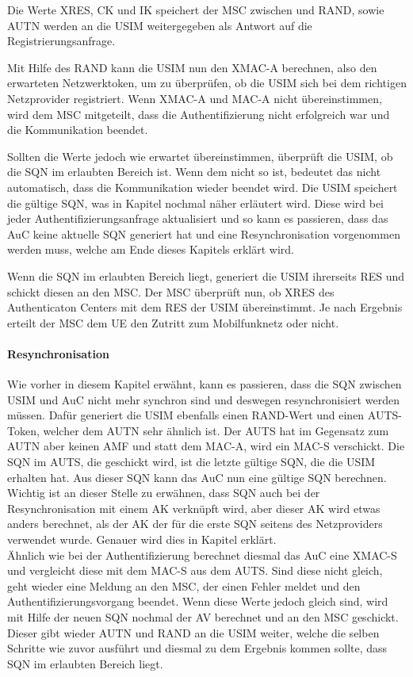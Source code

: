  Die Werte XRES, CK und IK speichert der MSC zwischen und RAND, sowie AUTN werden an die USIM
 weitergegeben als Antwort auf die Registrierungsanfrage.

 Mit Hilfe des RAND kann die USIM nun den XMAC-A berechnen, also den erwarteten Netzwerktoken, um
 zu überprüfen, ob die USIM sich bei dem richtigen Netzprovider registriert. Wenn XMAC-A
 und MAC-A nicht übereinstimmen, wird dem MSC mitgeteilt, dass die Authentifizierung nicht erfolgreich
 war und die Kommunikation beendet.

 Sollten die Werte jedoch wie erwartet übereinstimmen, überprüft die USIM, ob die SQN im erlaubten
 Bereich ist. Wenn dem nicht so ist, bedeutet das nicht automatisch, dass die Kommunikation wieder
 beendet wird. Die USIM speichert die gültige SQN, was in Kapitel 
 nochmal näher erläutert wird. Diese wird bei jeder Authentifizierungsanfrage aktualisiert und so kann
 es passieren, dass das AuC keine aktuelle SQN generiert hat und eine Resynchronisation vorgenommen
 werden muss, welche am Ende dieses Kapitels erklärt wird.
 
 Wenn die SQN im erlaubten Bereich liegt, generiert die USIM ihrerseits RES und schickt diesen an
 den MSC. Der MSC überprüft nun, ob XRES des Authenticaton Centers mit dem RES der USIM
 übereinstimmt. Je nach Ergebnis erteilt der MSC dem \ac{UE} den Zutritt zum Mobilfunknetz oder
 nicht.
 
 \paragraph{Resynchronisation}
 \label{par:resynchronisation}
  Wie vorher in diesem Kapitel erwähnt, kann es passieren, dass die SQN zwischen USIM und AuC
  nicht mehr synchron sind und deswegen resynchronisiert werden müssen. Dafür generiert die
  USIM ebenfalls einen RAND-Wert und einen AUTS-Token, welcher dem AUTN sehr ähnlich ist.
  Der AUTS hat im Gegensatz zum AUTN aber keinen AMF und statt dem MAC-A, wird ein MAC-S
  verschickt. Die SQN im AUTS, die geschickt wird, ist die letzte gültige SQN, die die USIM erhalten
  hat. Aus dieser SQN kann das AuC nun eine gültige SQN berechnen. Wichtig ist an dieser
  Stelle zu erwähnen, dass SQN auch bei der Resynchronisation mit einem AK verknüpft wird,
  aber dieser AK wird etwas anders berechnet, als der AK der für die erste SQN seitens des
  Netzproviders verwendet wurde. Genauer wird dies in Kapitel 
  erklärt.\\
  Ähnlich wie bei der Authentifizierung berechnet diesmal das AuC eine XMAC-S und vergleicht
  diese mit dem MAC-S aus dem AUTS. Sind diese nicht gleich, geht wieder eine Meldung an den
  MSC, der einen Fehler meldet und den Authentifizierungsvorgang beendet. Wenn diese Werte
  jedoch gleich sind, wird mit Hilfe der neuen SQN nochmal der AV berechnet und an den MSC
  geschickt. Dieser gibt wieder AUTN und RAND an die USIM weiter, welche die selben Schritte
  wie zuvor ausführt und diesmal zu dem Ergebnis kommen sollte, dass SQN im erlaubten
  Bereich liegt.
  
